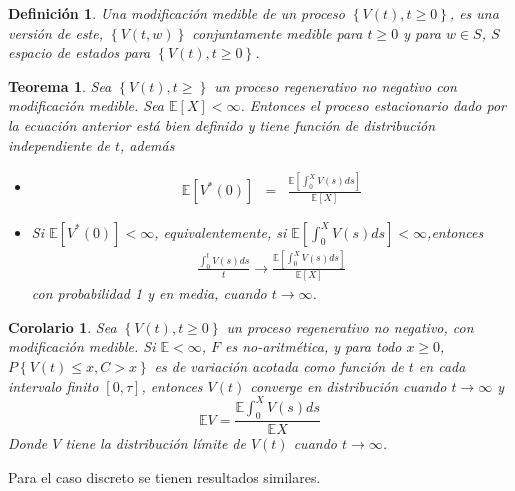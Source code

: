 \documentclass{article}
\newtheorem{Def}{Definición}
\newtheorem{Teo}{Teorema}
\newtheorem{Coro}{Corolario}
\newcommand{\esp}{\mathbb{E}}
\begin{document}
\begin{Def}
Una modificaci\'on medible de un proceso $\left\{V\left(t\right),t\geq0\right\}$, es una versi\'on de este, $\left\{V\left(t,w\right)\right\}$ conjuntamente medible para $t\geq0$ y para $w\in S$, $S$ espacio de estados para $\left\{V\left(t\right),t\geq0\right\}$.
\end{Def}

\begin{Teo}
Sea $\left\{V\left(t\right),t\geq\right\}$ un proceso regenerativo no negativo con modificaci\'on medible. Sea $\esp\left[X\right]<\infty$. Entonces el proceso estacionario dado por la ecuaci\'on anterior est\'a bien definido y tiene funci\'on de distribuci\'on independiente de $t$, adem\'as
\begin{itemize}
\item[i)] \begin{eqnarray*}
\esp\left[V^{*}\left(0\right)\right]&=&\frac{\esp\left[\int_{0}^{X}V\left(s\right)ds\right]}{\esp\left[X\right]}\end{eqnarray*}
\item[ii)] Si $\esp\left[V^{*}\left(0\right)\right]<\infty$, equivalentemente, si $\esp\left[\int_{0}^{X}V\left(s\right)ds\right]<\infty$,entonces
\begin{eqnarray*}
\frac{\int_{0}^{t}V\left(s\right)ds}{t}\rightarrow\frac{\esp\left[\int_{0}^{X}V\left(s\right)ds\right]}{\esp\left[X\right]}
\end{eqnarray*}
con probabilidad 1 y en media, cuando $t\rightarrow\infty$.
\end{itemize}
\end{Teo}

\begin{Coro}
Sea $\left\{V\left(t\right),t\geq0\right\}$ un proceso regenerativo no negativo, con modificaci\'on medible. Si $\esp <\infty$, $F$ es no-aritm\'etica, y para todo $x\geq0$, $P\left\{V\left(t\right)\leq x,C>x\right\}$ es de variaci\'on acotada como funci\'on de $t$ en cada intervalo finito $\left[0,\tau\right]$, entonces $V\left(t\right)$ converge en distribuci\'on  cuando $t\rightarrow\infty$ y $$\esp V=\frac{\esp \int_{0}^{X}V\left(s\right)ds}{\esp X}$$
Donde $V$ tiene la distribuci\'on l\'imite de $V\left(t\right)$ cuando $t\rightarrow\infty$.

\end{Coro}

Para el caso discreto se tienen resultados similares.



\end{document}
